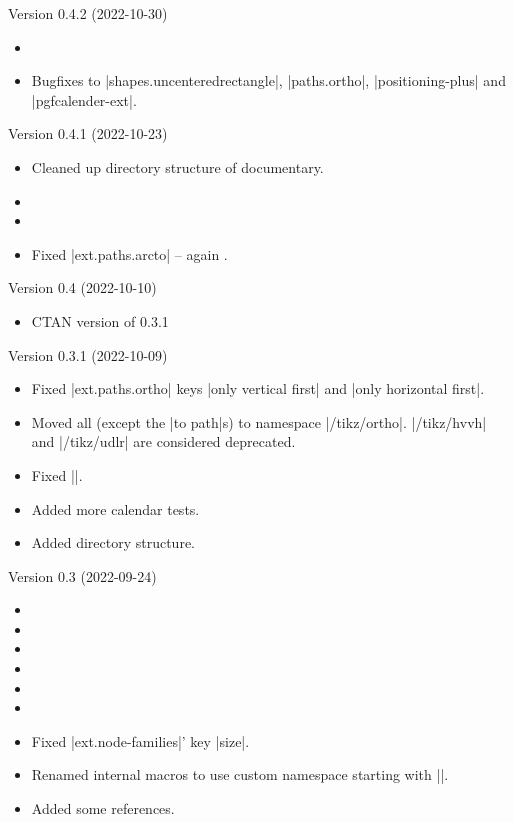 \begin{multicols}{2}
\begin{itemize}
\end{itemize}
Version 0.4.2 (2022-10-30)
\begin{itemize}
\item {}
\item Bugfixes to |shapes.uncenteredrectangle|, |paths.ortho|, |positioning-plus| and |pgfcalender-ext|.
\end{itemize}
Version 0.4.1 (2022-10-23)
\begin{itemize}
\item Cleaned up directory structure of documentary.
\item {}
\item {}
\item Fixed |ext.paths.arcto| -- again \cite{GH2}.
\end{itemize}
Version 0.4 (2022-10-10)
\begin{itemize}
\item CTAN version of 0.3.1
\end{itemize}
Version 0.3.1 (2022-10-09)
\begin{itemize}
\item Fixed |ext.paths.ortho| keys |only vertical first| and |only horizontal first|.
\item Moved all (except the |to path|s) to namespace |/tikz/ortho|.
     |/tikz/hvvh| and |/tikz/udlr| are considered deprecated.
\item Fixed |\pgfcalendarjulianyeartoweek|.
\item Added more calendar tests.
\item Added directory structure.
\end{itemize}
Version 0.3 (2022-09-24)
\begin{itemize}
\item {}
\item {}
\item {}
\item {}
\item {}
\item {}
\item Fixed |ext.node-families|' key |size|.
\item Renamed internal macros to use custom namespace starting with |\tikzext@|.
\item Added some references.

\end{itemize}
\end{multicols}
